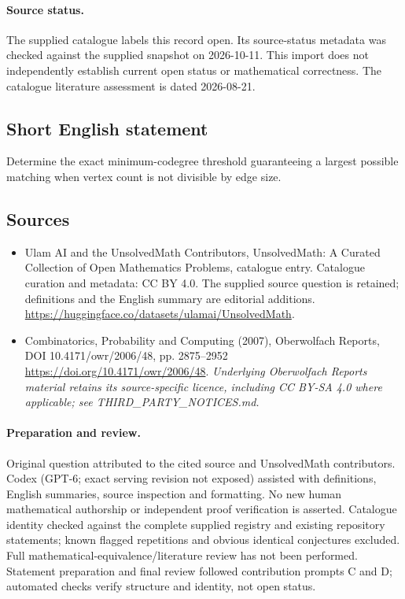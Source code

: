 \documentclass[11pt]{article}
\begin{document}
\paragraph{Source status.}
The supplied catalogue labels this record open. Its source-status metadata was checked against the supplied snapshot on 2026-10-11. This import does not independently establish current open status or mathematical correctness. The catalogue literature assessment is dated 2026-08-21.
\subsection{Short English statement}
Determine the exact minimum-codegree threshold guaranteeing a largest possible matching when vertex count is not divisible by edge size.
\subsection{Sources}
\begin{itemize}
\item[S1] Ulam AI and the UnsolvedMath Contributors, UnsolvedMath: A Curated Collection of Open Mathematics Problems, catalogue entry. Catalogue curation and metadata: CC BY 4.0. The supplied source question is retained; definitions and the English summary are editorial additions.
\url{https://huggingface.co/datasets/ulamai/UnsolvedMath}.
\item[S2] Combinatorics, Probability and Computing (2007), Oberwolfach Reports, DOI 10.4171/owr/2006/48, pp. 2875--2952
\url{https://doi.org/10.4171/owr/2006/48}.
\textit{Underlying Oberwolfach Reports material retains its source-specific licence, including CC BY-SA 4.0 where applicable; see THIRD\_PARTY\_NOTICES.md.}
\end{itemize}
\paragraph{Preparation and review.}
Original question attributed to the cited source and UnsolvedMath contributors. Codex (GPT-6; exact serving revision not exposed) assisted with definitions, English summaries, source inspection and formatting. No new human mathematical authorship or independent proof verification is asserted. Catalogue identity checked against the complete supplied registry and existing repository statements; known flagged repetitions and obvious identical conjectures excluded. Full mathematical-equivalence/literature review has not been performed. Statement preparation and final review followed contribution prompts C and D; automated checks verify structure and identity, not open status.
\label{end:statement}
\end{document}
